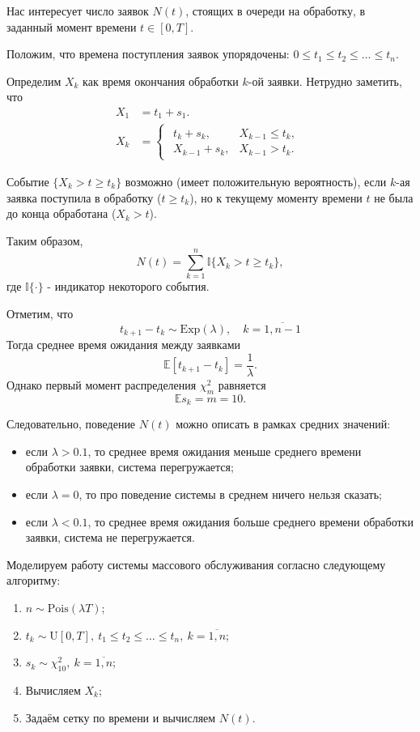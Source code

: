 \documentclass[11pt]{report}
\begin{document}
Нас интересует число заявок $N(t)$, стоящих в очереди на обработку, в заданный момент времени $t\in[0,T]$.

Положим, что времена поступления заявок упорядочены: $0\leqslant t_1\leqslant t_2\leqslant \dots\leqslant t_n$.

Определим $X_k$ как время окончания обработки $k$-ой заявки. Нетрудно заметить, что
$$
\begin{aligned}
X_1 &= t_1 + s_1. \\
X_k &= \begin{cases}\begin{array}{cc}
t_k + s_k, & X_{k-1} \leqslant t_{k}, \\
X_{k-1} + s_k, & X_{k-1} > t_{k}.
\end{array}\end{cases}
\end{aligned}
$$

Событие $\{X_k > t \geqslant t_k\}$ возможно (имеет положительную вероятность), если $k$-ая заявка поступила в обработку ($t \geqslant t_k$), но к текущему моменту времени $t$ не была до конца обработана ($X_k > t$).

Таким образом,
$$
N(t) = \sum_{k=1}^n \mathbb{I}\{ X_k > t \geqslant t_k \},
$$
где $\mathbb{I}\{\cdot\}$ - индикатор некоторого события.

Отметим, что
$$
t_{k+1}-t_k\sim\mathrm{Exp}(\lambda),\quad k=\overline{1,n-1}
$$
Тогда среднее время ожидания между заявками
$$
\mathbb{E}[t_{k+1}-t_k] = \frac{1}{\lambda}.
$$
Однако первый момент распределения $\chi^2_m$ равняется
$$
\mathbb{E}s_k = m = 10.
$$

Следовательно, поведение $N(t)$ можно описать в рамках средних значений:
\begin{itemize}
\item если $\lambda > 0.1$, то среднее время ожидания меньше среднего времени обработки заявки, система перегружается;
\item если $\lambda = 0$, то про поведение системы в среднем ничего нельзя сказать;
\item если $\lambda < 0.1$, то среднее время ожидания больше среднего времени обработки заявки, система не перегружается.
\end{itemize}

Моделируем работу системы массового обслуживания согласно следующему алгоритму:
\begin{enumerate}
\item $n\sim\mathrm{Pois}(\lambda T)$;
\item $t_k\sim\mathrm{U}[0,T],~ t_1\leqslant t_2\leqslant \dots \leqslant t_n,~ k=\overline{1,n}$;
\item $s_k\sim\chi^2_{10},~ k=\overline{1,n}$;
\item Вычисляем $X_k$;
\item Задаём сетку по времени и вычисляем $N(t)$.
\end{enumerate}
\end{document}
